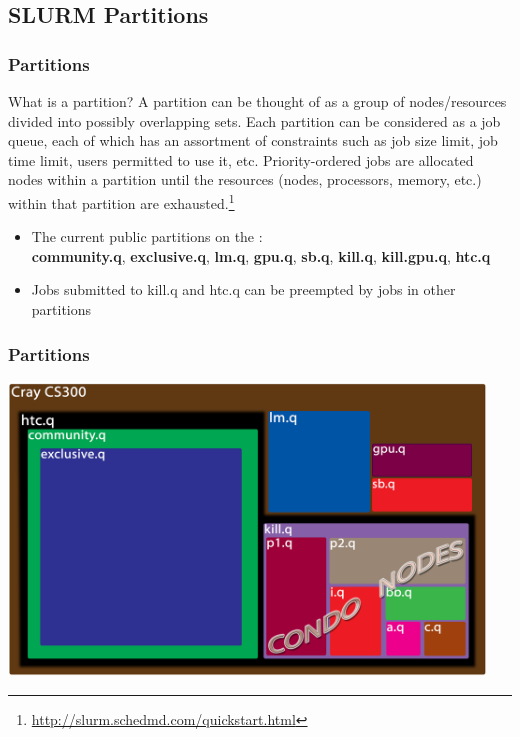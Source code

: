 \subsection{SLURM Partitions}
\begin{frame}
\footnotesize
\frametitle{Partitions}
\begin{block}{What is a partition?}\footnotesize
A partition can be thought of as a group of nodes/resources divided into possibly overlapping sets.  Each partition can be considered as a job queue, each of which has an assortment of constraints such as job size limit, job time limit, users permitted to use it, etc. Priority-ordered jobs are allocated nodes within a partition until the resources (nodes, processors, memory, etc.) within that partition are exhausted.\footnote{\label{schedmd_qstart}\tiny \url{http://slurm.schedmd.com/quickstart.html}}
\end{block}
\begin{itemize}
	\item The current public partitions on the {\craycs}:~\\\textbf{community.q}, \textbf{exclusive.q}, \textbf{lm.q}, \textbf{gpu.q}, \textbf{sb.q}, \textbf{kill.q}, \textbf{kill.gpu.q}, \textbf{htc.q}
	\item Jobs submitted to kill.q and htc.q can be preempted by jobs in other partitions
\end{itemize}
\end{frame}

\begin{frame}
\frametitle{Partitions}
\includegraphics[width=0.95\textwidth]{images/partitions}
\end{frame}

